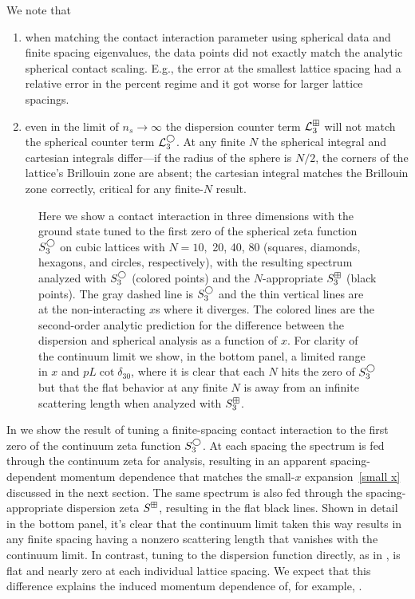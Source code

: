 We note that
\begin{enumerate}
	\item when matching the contact interaction parameter using spherical \Luscher data and finite spacing eigenvalues, the data points did not exactly match the analytic spherical contact scaling.
	E.g., the error at the smallest lattice spacing had a relative error in the percent regime and it got worse for larger lattice spacings.
	\item even in the limit of $n_s \to \infty$ the dispersion counter term $\mathcal{L}^\boxplus_3$ will not match the spherical counter term $\mathcal{L}^{\bigcirc}_3$.
At any finite $N$ the spherical integral and cartesian integrals differ---if the radius of the sphere is $N/2$, the corners of the lattice's Brillouin zone are absent; the cartesian integral matches the Brillouin zone correctly, critical for any finite-$N$ result.
\end{enumerate}

\begin{figure}[htb]
    \scalebox{0.8}{}
    \caption{
        Here we show a contact interaction in three dimensions with the ground state tuned to the first zero of the spherical zeta function $S^{\bigcirc}_3$ on cubic lattices with $N=10,$ 20, 40, 80 (squares, diamonds, hexagons, and circles, respectively), with the resulting spectrum analyzed with $S^{\bigcirc}_3$ (colored points) and the $N$-appropriate $S^{\boxplus}_3$ (black points).
        The gray dashed line is $S^\bigcirc_3$ and the thin vertical lines are at the non-interacting $x$s where it diverges.
        The colored lines are the second-order analytic prediction for the difference between the dispersion and spherical analysis as a function of $x$.
        For clarity of the continuum limit we show, in the bottom panel, a limited range in $x$ and $pL\cot\delta_{30}$, where it is clear that each $N$ hits the zero of $S^\bigcirc_3$ but that the flat behavior at any finite $N$ is away from an infinite scattering length when analyzed with $S^\boxplus_3$.
    }
    \label{fig:3d-corrections}
\end{figure}



In  we show the result of tuning a finite-spacing contact interaction to the first zero of the continuum zeta function $S^\bigcirc_3$.
At each spacing the spectrum is fed through the continuum zeta for analysis, resulting in an apparent spacing-dependent momentum dependence that matches the small-$x$ expansion~\eqref{small x} discussed in the next section.
The same spectrum is also fed through the spacing-appropriate dispersion zeta $S^\boxplus$, resulting in the flat black lines.
Shown in detail in the bottom panel, it's clear that the continuum limit taken this way results in any finite spacing having a nonzero scattering length that vanishes with the continuum limit.
In contrast, tuning to the dispersion function directly, as in , is flat and nearly zero at each individual lattice spacing.
We expect that this difference explains the induced momentum dependence of, for example, .


